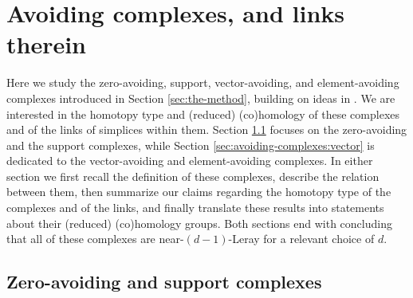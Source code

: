 \documentclass[a4paper,11pt,reqno, english]{amsart}
\theoremstyle{definition}
\theoremstyle{remark}
\begin{document}
\bigskip
\section{Avoiding complexes, and links therein}\label{sec:avoiding-complexes}
\bigskip

Here we study the zero-avoiding, support, vector-avoiding, and element-avoiding complexes introduced in Section \ref{sec:the-method}, building on ideas in \cite{Blagojevic2025}. We are interested in the homotopy type and (reduced) (co)homology of these complexes and of the links of simplices within them. Section \ref{sec:avoiding-complexes:zero} focuses on the zero-avoiding and the support complexes, while Section \ref{sec:avoiding-complexes:vector} is dedicated to the vector-avoiding and element-avoiding complexes. In either section we first recall the definition of these complexes, describe the relation between them, then summarize our claims regarding the homotopy type of the complexes and of the links, and finally translate these results into statements about their (reduced) (co)homology groups. Both sections end with concluding that all of these complexes are near-$(d-1)$-Leray for a relevant choice of $d$.

\medskip
\subsection{Zero-avoiding and support complexes}\label{sec:avoiding-complexes:zero}
\medskip
\end{document}
